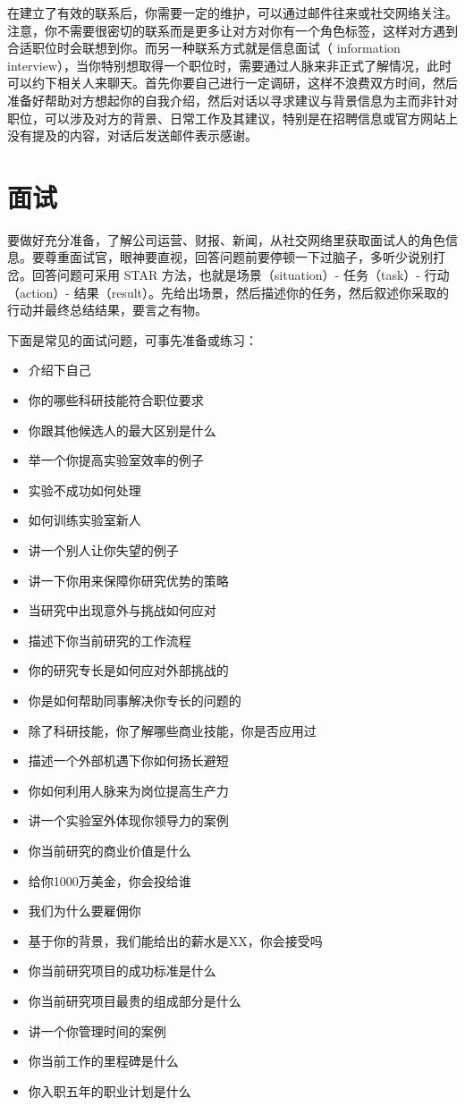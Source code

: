 \documentclass[]{tufte-book}
\providecommand{\tightlist}{%
  \setlength{\itemsep}{0pt}\setlength{\parskip}{0pt}}
\begin{document}
在建立了有效的联系后，你需要一定的维护，可以通过邮件往来或社交网络关注。注意，你不需要很密切的联系而是更多让对方对你有一个角色标签，这样对方遇到合适职位时会联想到你。而另一种联系方式就是信息面试（ information interview），当你特别想取得一个职位时，需要通过人脉来非正式了解情况，此时可以约下相关人来聊天。首先你要自己进行一定调研，这样不浪费双方时间，然后准备好帮助对方想起你的自我介绍，然后对话以寻求建议与背景信息为主而非针对职位，可以涉及对方的背景、日常工作及其建议，特别是在招聘信息或官方网站上没有提及的内容，对话后发送邮件表示感谢。

\hypertarget{ux9762ux8bd5}{%
\section{面试}\label{ux9762ux8bd5}}

要做好充分准备，了解公司运营、财报、新闻，从社交网络里获取面试人的角色信息。要尊重面试官，眼神要直视，回答问题前要停顿一下过脑子，多听少说别打岔。回答问题可采用 STAR 方法，也就是场景（situation）- 任务（task）- 行动（action）- 结果（result）。先给出场景，然后描述你的任务，然后叙述你采取的行动并最终总结结果，要言之有物。

下面是常见的面试问题，可事先准备或练习：

\begin{itemize}
\tightlist
\item
  介绍下自己
\item
  你的哪些科研技能符合职位要求
\item
  你跟其他候选人的最大区别是什么
\item
  举一个你提高实验室效率的例子
\item
  实验不成功如何处理
\item
  如何训练实验室新人
\item
  讲一个别人让你失望的例子
\item
  讲一下你用来保障你研究优势的策略
\item
  当研究中出现意外与挑战如何应对
\item
  描述下你当前研究的工作流程
\item
  你的研究专长是如何应对外部挑战的
\item
  你是如何帮助同事解决你专长的问题的
\item
  除了科研技能，你了解哪些商业技能，你是否应用过
\item
  描述一个外部机遇下你如何扬长避短
\item
  你如何利用人脉来为岗位提高生产力
\item
  讲一个实验室外体现你领导力的案例
\item
  你当前研究的商业价值是什么
\item
  给你1000万美金，你会投给谁
\item
  我们为什么要雇佣你
\item
  基于你的背景，我们能给出的薪水是XX，你会接受吗
\item
  你当前研究项目的成功标准是什么
\item
  你当前研究项目最贵的组成部分是什么
\item
  讲一个你管理时间的案例
\item
  你当前工作的里程碑是什么
\item
  你入职五年的职业计划是什么
\end{itemize}
\end{document}
